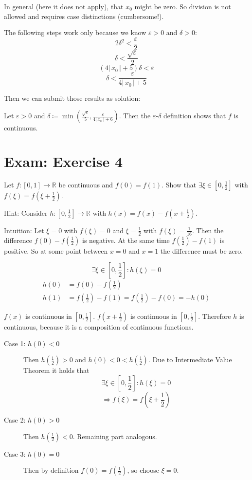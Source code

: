 \documentclass[a4paper]{article}
\theoremstyle{definition}
\newcommand\abs[1]{\left|\,#1\,\right|}
\begin{document}
In general (here it does not apply), that $x_0$ might be zero. So division is not allowed and requires case distinctions (cumbersome!).

The following steps work only because we know $\varepsilon > 0$ and $\delta > 0$:
\[ 2 \delta^2 < \frac{\varepsilon}{2} \]
\[ \delta < \frac{\sqrt{\varepsilon}}{2} \]
\[ (4 \abs{x_0} + 5) \delta < \varepsilon \]
\[ \delta < \frac{\varepsilon}{4 \abs{x_0} + 5} \]

Then we can submit those results as solution:

Let $\varepsilon > 0$ and $\delta \coloneqq \min\left(\frac{\sqrt{\varepsilon}}{5}, \frac{\varepsilon}{4 \abs{x_0} + 6}\right)$.
Then the $\varepsilon$-$\delta$ definition shows that $f$ is continuous.

\section{Exam: Exercise 4}
%
\begin{ex}
  Let $f: [0,1] \to \mathbb R$ be continuous and $f(0) = f(1)$.
  Show that $\exists \xi \in [0,\frac12]$ with $f(\xi) = f(\xi + \frac12)$.

  Hint: Consider $h: [0, \frac12] \to \mathbb R$ with $h(x) = f(x) - f(x + \frac12)$.
\end{ex}

Intuition:
Let $\xi = 0$ with $f(\xi) = 0$ and $\xi = \frac12$ with $f(\xi) = \frac1{16}$.
Then the difference $f(0) - f(\frac12)$ is negative. At the same time $f(\frac12) - f(1)$ is positive.
So at some point between $x=0$ and $x=1$ the difference must be zero.

\[ \exists \xi \in [0,\frac12]: h(\xi) = 0 \]
\begin{align*}
  h(0) &= f(0) - f\left(\frac12\right) \\
  h(1) &= f\left(\frac12\right) - f(1) = f\left(\frac12\right) - f(0) = -h(0)
\end{align*}

$f(x)$ is continuous in $[0,\frac12]$. $f(x + \frac12)$ is continuous in $[0,\frac12]$.
Therefore $h$ is continuous, because it is a composition of continuous functions.

\begin{description}
  \item[Case 1: $h(0) < 0$]
    Then $h(\frac12) > 0$ and $h(0) < 0 < h(\frac12)$.
    Due to Intermediate Value Theorem it holds that
    \[ \exists \xi \in [0, \frac12]: h(\xi) = 0 \]
    \[ \Rightarrow f(\xi) = f(\xi + \frac12) \]
  \item[Case 2: $h(0) > 0$]
    Then $h(\frac12) < 0$. Remaining part analogous.
  \item[Case 3: $h(0) = 0$]
    Then by definition $f(0) = f(\frac12)$, so choose $\xi = 0$.
\end{description}
\end{document}
